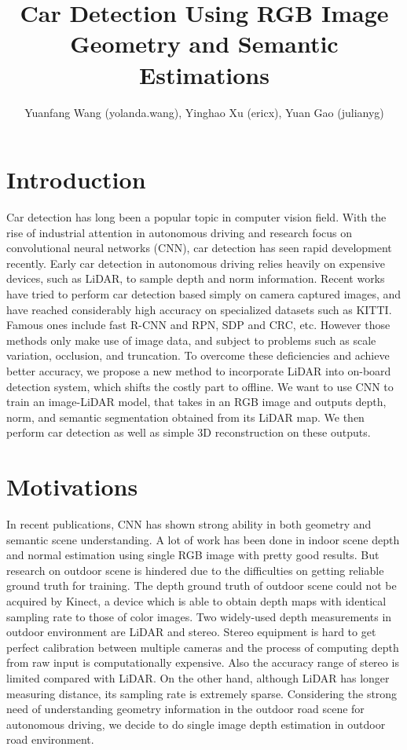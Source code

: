 \documentclass[a4paper]{article}
\title{Car Detection Using RGB Image Geometry and Semantic Estimations}
\author{Yuanfang Wang (yolanda.wang), Yinghao Xu (ericx), Yuan Gao (julianyg)}
\begin{document}
\maketitle


\section{Introduction}
Car detection has long been a popular topic in computer vision field. With the rise of industrial attention in autonomous driving and research focus on convolutional neural networks (CNN), car detection has seen rapid development recently. Early car detection in autonomous driving relies heavily on expensive devices, such as LiDAR, to sample depth and norm information. Recent works have tried to perform car detection based simply on camera captured images, and have reached considerably high accuracy on specialized datasets such as KITTI. Famous ones include fast R-CNN and RPN\cite{renFasterRCNN}, SDP and CRC\cite{sdpcrc}, etc. However those methods only make use of image data, and subject to problems such as scale variation, occlusion, and truncation\cite{subcatCNN}. To overcome these deficiencies and achieve better accuracy, we propose a new method to incorporate LiDAR into on-board detection system, which shifts the costly part to offline. We want to use CNN to train an image-LiDAR model, that takes in an RGB image and outputs depth, norm, and semantic segmentation obtained from its LiDAR map. We then perform car detection as well as simple 3D reconstruction on these outputs.

\section{Motivations}
In recent publications, CNN has shown strong ability in both geometry and semantic scene understanding. A lot of work has been done in indoor scene depth and normal estimation using single RGB image with pretty good results\cite{laina2016deeper}\cite{li2015depth}\cite{hane2015direction}\cite{eigen2015predicting}. But research on outdoor scene is hindered due to the difficulties on getting reliable ground truth for training. The depth ground truth of outdoor scene could not be acquired by Kinect, a device which is able to obtain depth maps with identical sampling rate to those of color images. Two widely-used depth measurements in outdoor environment are LiDAR and stereo. Stereo equipment is hard to get perfect calibration between multiple cameras and the process of computing depth from raw input is computationally expensive. Also the accuracy range of stereo is limited compared with LiDAR. On the other hand, although LiDAR has longer measuring distance, its sampling rate is extremely sparse. Considering the strong need of understanding geometry information in the outdoor road scene for autonomous driving, we decide to do single image depth estimation in outdoor road environment. 
\end{document}

